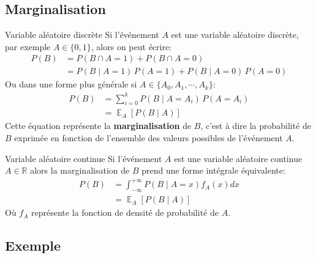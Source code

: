 \documentclass[10pt]{beamer}  %
\newcommand{\E}[2][]{\operatorname{\mathbb{E}}_{#1}\left[#2\right]}
\begin{document}
\subsection{Marginalisation}

\begin{frame}{Variable aléatoire discrète}
	Si l'événement $A$ est une variable aléatoire discrète, par exemple $A \in \{0, 1\}$, alors on peut écrire:
	\begin{equation}
		\begin{aligned}
			P(B) &= P(B \cap A=1) + P(B \cap A=0) \\
			     &= P(B \mid A=1) \, P(A=1) + P(B \mid A=0) \, P(A=0)
		\end{aligned}
		\nonumber 
	\end{equation}
	\pause
	Ou dans une forme plus générale si $A \in \{A_0, A_1, \cdots, A_k\}$:
	\begin{equation}
		\begin{aligned}
			P(B) &= \sum_{i=0}^k P(B \mid A=A_i) \, P(A=A_i) \\
			     &= \E[A]{P(B \mid A)}
		\end{aligned}
		\nonumber
	\end{equation}
	\pause
	Cette équation représente la \textbf{marginalisation} de $B$, c'est à dire la probabilité de $B$ exprimée en fonction de l'ensemble des valeurs possibles de l'événement $A$.
\end{frame}

\begin{frame}{Variable aléatoire continue}
	Si l'événement $A$ est une variable aléatoire continue $A \in \mathbb{R}$ alors la marginalisation de $B$ prend une forme intégrale équivalente:
	\begin{equation}
		\begin{aligned}
			P(B) &= \int_{-\infty}^{+\infty} P(B \mid A=x) f_A(x) dx \\
			     &= \E[A]{P(B \mid A)}
		\end{aligned}
		\nonumber
	\end{equation}
	Où $f_A$ représente la fonction de densité de probabilité de $A$.
\end{frame}

\subsection{Exemple}
\end{document}
